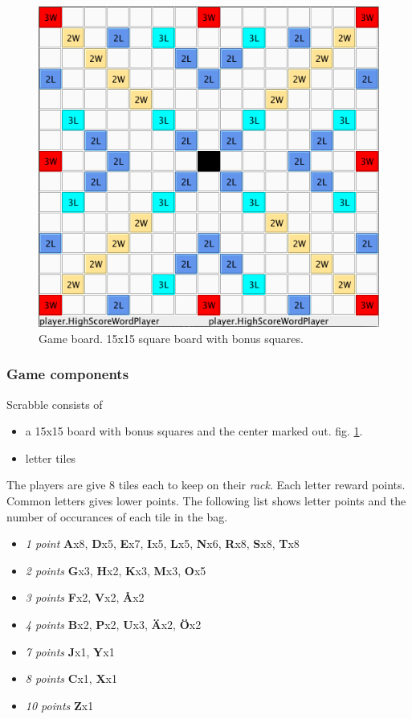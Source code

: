 \documentclass[a4paper, 12pt]{report}
\begin{document}
\begin{figure}[h]
\centering
\includegraphics[scale=0.5]{board}
\caption {Game board. 15x15 square board with bonus squares.}
\label{fig:game-board}
\end{figure}

\subsubsection{Game components}
Scrabble consists of 

\begin{itemize}
\item a 15x15 board with bonus squares and the center marked out. fig. \ref{fig:game-board}.
\item letter tiles
\end{itemize}

The players are give 8 tiles each to keep on their \emph{rack}. Each letter reward points. Common letters gives lower points. The following list shows letter points and the number of occurances of each tile in the bag.

\begin{itemize}
	\item{\emph{1 point}} \textbf{A}x8, \textbf{D}x5, \textbf{E}x7, \textbf{I}x5, \textbf{L}x5, \textbf{N}x6, \textbf{R}x8, \textbf{S}x8, \textbf{T}x8
	\item{\emph{2 points}} \textbf{G}x3, \textbf{H}x2, \textbf{K}x3, \textbf{M}x3, \textbf{O}x5
	\item{\emph{3 points}} \textbf{F}x2, \textbf{V}x2, \textbf{Å}x2
	\item{\emph{4 points}} \textbf{B}x2, \textbf{P}x2, \textbf{U}x3, \textbf{Ä}x2, \textbf{Ö}x2
	\item{\emph{7 points}} \textbf{J}x1, \textbf{Y}x1
	\item{\emph{8 points}} \textbf{C}x1, \textbf{X}x1
	\item{\emph{10 points}} \textbf{Z}x1
\end{itemize}
\end{document}

